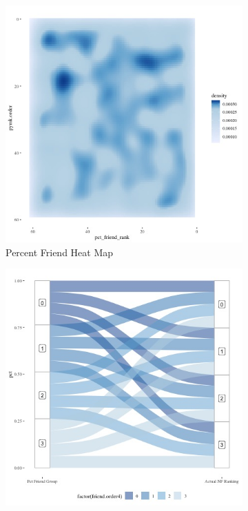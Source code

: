 \documentclass[12pt,letterpaper]{article}
\begin{document}
\begin{figure}[ht]
\caption{Relationship between PYMK Algorithmic Ranking and Chronology and User Stated Preferences}
\label{fig:pymk}
    \begin{subfigure}{.5\textwidth} 
        \centering
        \includegraphics[width=1\linewidth]{Output/Graphs/Audit/Heatmaps/US PYMK pct friends by pymk rank - smooth.jpg}   
        \caption{Percent Friend Heat Map}
        \label{fig:pymkfriend_hm}
        \end{subfigure}
    \begin{subfigure}{.5\textwidth}
        \centering
        \includegraphics[width=1\linewidth]{Output/Graphs/Audit/Sankey flows/US PYMK pct friend to actual.jpg}  

\end{subfigure}
\end{figure}
\end{document}
